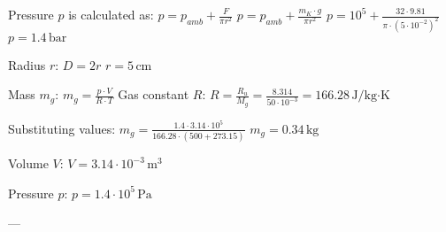 Pressure \( p \) is calculated as:  
\( p = p_{amb} + \frac{F}{\pi r^2} \)  
\( p = p_{amb} + \frac{m_K \cdot g}{\pi r^2} \)  
\( p = 10^5 + \frac{32 \cdot 9.81}{\pi \cdot (5 \cdot 10^{-2})^2} \)  
\( p = 1.4 \, \text{bar} \)  

Radius \( r \):  
\( D = 2r \)  
\( r = 5 \, \text{cm} \)  

Mass \( m_g \):  
\( m_g = \frac{p \cdot V}{R \cdot T} \)  
Gas constant \( R \):  
\( R = \frac{R_u}{M_g} = \frac{8.314}{50 \cdot 10^{-3}} = 166.28 \, \text{J/kg·K} \)  

Substituting values:  
\( m_g = \frac{1.4 \cdot 3.14 \cdot 10^5}{166.28 \cdot (500 + 273.15)} \)  
\( m_g = 0.34 \, \text{kg} \)  

Volume \( V \):  
\( V = 3.14 \cdot 10^{-3} \, \text{m}^3 \)  

Pressure \( p \):  
\( p = 1.4 \cdot 10^5 \, \text{Pa} \)  

---